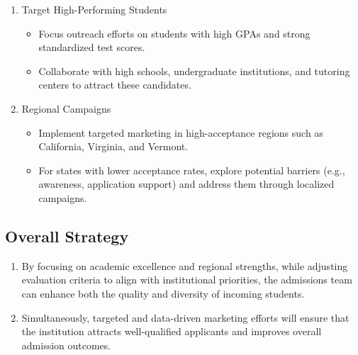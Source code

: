 \documentclass[
  letterpaper,
  DIV=11,
  numbers=noendperiod]{scrartcl}
\providecommand{\tightlist}{%
  \setlength{\itemsep}{0pt}\setlength{\parskip}{0pt}}\usepackage{longtable,booktabs,array}
\begin{document}
\begin{enumerate}
\def\labelenumi{\arabic{enumi}.}
\tightlist
\item
  Target High-Performing Students

  \begin{itemize}
  \tightlist
  \item
    Focus outreach efforts on students with high GPAs and strong
    standardized test scores.
  \item
    Collaborate with high schools, undergraduate institutions, and
    tutoring centers to attract these candidates.
  \end{itemize}
\item
  Regional Campaigns

  \begin{itemize}
  \tightlist
  \item
    Implement targeted marketing in high-acceptance regions such as
    California, Virginia, and Vermont.
  \item
    For states with lower acceptance rates, explore potential barriers
    (e.g., awareness, application support) and address them through
    localized campaigns.
  \end{itemize}
\end{enumerate}

\subsection{Overall Strategy}\label{overall-strategy}

\begin{enumerate}
\def\labelenumi{\arabic{enumi}.}
\tightlist
\item
  By focusing on academic excellence and regional strengths, while
  adjusting evaluation criteria to align with institutional priorities,
  the admissions team can enhance both the quality and diversity of
  incoming students.
\item
  Simultaneously, targeted and data-driven marketing efforts will ensure
  that the institution attracts well-qualified applicants and improves
  overall admission outcomes.
\end{enumerate}
\end{document}
